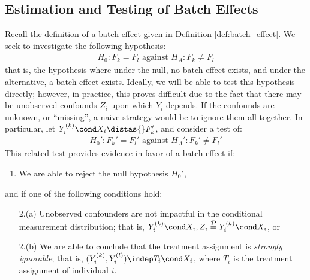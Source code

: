 
\subsection{Estimation and Testing of Batch Effects}
\label{sec:batch_est}
Recall the definition of a batch effect given in Definition \ref{def:batch_effect}. We seek to investigate the following hypothesis:
\begin{align}
    H_0: F_k = F_l \textrm{ against }H_A: F_k \neq F_l
    \label{eqn:batch_full}
\end{align}
that is, the hypothesis where under the null, no batch effect exists, and under the alternative, a batch effect exists. Ideally, we will be able to test this hypothesis directly; however, in practice, this proves difficult due to the fact that there may be unobserved confounds $Z_i$ upon which $Y_i$ depends. If the confounds are unknown, or ``missing'', a naive strategy would be to ignore them all together. In particular, let $Y_i^{(k)} \cond X_i \distas{} F_k'$, and consider a test of:
\begin{align}
    H_0': F_k' = F_l' \textrm{ against }H_A': F_k' \neq F_l'
    \label{eqn:batch_ignorable}
\end{align}
This related test provides evidence in favor of a batch effect if:
\begin{enumerate}
    \item We are able to reject the null hypothesis $H_0'$,
\end{enumerate}
and if one of the following conditions hold:
\begin{itemize}
    \item[2.(a)] Unobserved confounders are not impactful in the conditional measurement distribution; that is, $Y_i^{(k)} \cond X_i, Z_i \overset{\mathcal D}{=}Y_i^{(k)} \cond X_i$, or
    \item[2.(b)] We are able to conclude that the treatment assignment is \textit{strongly ignorable}; that is, $(Y_i^{(k)}, Y_i^{(l)}) \indep T_i \cond X_i$, where $T_i$ is the treatment assignment of individual $i$.
\end{itemize}
